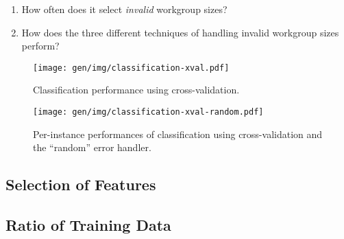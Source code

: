 \begin{enumerate}
\item How often does it select \emph{invalid} workgroup sizes?
\item How does the three different techniques of handling invalid
  workgroup sizes perform?
\end{enumerate}

\begin{figure}
\centering
\texttt{[image: gen/img/classification-xval.pdf]}
\caption{%
  Classification performance using cross-validation.%
}
\end{figure}

\begin{figure}
\centering
\texttt{[image: gen/img/classification-xval-random.pdf]}
\caption{%
  Per-instance performances of classification using cross-validation
  and the ``random'' error handler.%
}
\end{figure}




\subsection{Selection of Features}


\subsection{Ratio of Training Data}






